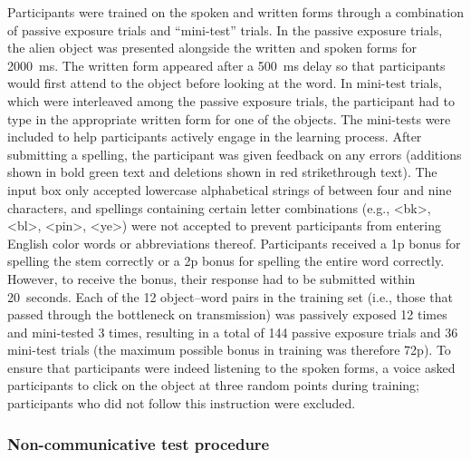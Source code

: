 \documentclass[doc,biblatex]{apa7}
\begin{document}
Participants were trained on the spoken and written forms through a combination of passive exposure trials and ``mini-test'' trials. In the passive exposure trials, the alien object was presented alongside the written and spoken forms for 2000~ms. The written form appeared after a 500~ms delay so that participants would first attend to the object before looking at the word. In mini-test trials, which were interleaved among the passive exposure trials, the participant had to type in the appropriate written form for one of the objects. The mini-tests were included to help participants actively engage in the learning process. After submitting a spelling, the participant was given feedback on any errors (additions shown in bold green text and deletions shown in red strikethrough text). The input box only accepted lowercase alphabetical strings of between four and nine characters, and spellings containing certain letter combinations (e.g., <bk>, <bl>, <pin>, <ye>) were not accepted to prevent participants from entering English color words or abbreviations thereof. Participants received a 1p bonus for spelling the stem correctly or a 2p bonus for spelling the entire word correctly. However, to receive the bonus, their response had to be submitted within 20~seconds. Each of the 12 object--word pairs in the training set (i.e., those that passed through the bottleneck on transmission) was passively exposed 12 times and mini-tested 3 times, resulting in a total of 144 passive exposure trials and 36 mini-test trials (the maximum possible bonus in training was therefore 72p). To ensure that participants were indeed listening to the spoken forms, a voice asked participants to click on the object at three random points during training; participants who did not follow this instruction were excluded.

\subsubsection{Non-communicative test procedure}
\end{document}
